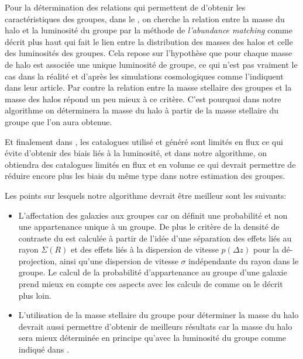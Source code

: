 Pour la détermination des relations qui permettent de d'obtenir les caractéristiques des groupes, dans le \citet{Yang+07}, on
cherche la relation entre la masse du halo et la luminosité du groupe par la méthode de \emph{l'abundance matching} comme décrit
plus haut qui fait le lien entre la distribution des masses des halos et celle des luminosités des groupes. Cela repose sur
l'hypothèse que pour chaque masse de halo est associée une unique luminosité de groupe, ce qui n'est pas vraiment le cas dans la
réalité et d'après les simulations cosmologiques comme l'indiquent \citet{Yang+07} dans leur article. Par contre la relation entre
la masse stellaire des groupes et la masse des halos répond un peu mieux à ce critère. C'est pourquoi dans notre algorithme on
déterminera la masse du halo à partir de la masse stellaire du groupe que l'on aura obtenue.

Et finalement dans \citet{Yang+07}, les catalogues utilisé et généré sont limités en flux ce qui évite d'obtenir des biais liés à
la luminosité, et dans notre algorithme, on obtiendra des catalogues limités en flux et en volume ce qui devrait permettre de
réduire encore plus les biais du même type dans notre estimation des groupes.

Les points sur lesquels notre algorithme devrait être meilleur sont les suivants:
\begin{itemize}
	\item L'affectation des galaxies aux groupes car on définit une probabilité et non une appartenance unique à un groupe. De
	plus le critère de la densité de contraste du \citet{Yang+07} est calculée à partir de l'idée d'une séparation des effets
	liés au rayon $\Sigma(R)$ et des effets liés à la dispersion de vitesse $p(\Delta{z})$ pour la dé-projection, ainsi qu'une
	dispersion de vitesse $\sigma$ indépendante du rayon dans le groupe. Le calcul de la probabilité d'appartenance au groupe
	d'une galaxie prend mieux en compte ces aspects avec les calculs de \citet{MBM10} comme on le décrit plus loin.
	\item L'utilisation de la masse stellaire du groupe pour déterminer la masse du halo devrait aussi permettre d'obtenir de
	meilleurs résultats car la masse du halo sera mieux déterminée en principe qu'avec la luminosité du groupe comme indiqué
	dans \citet{Yang+07}.
\end{itemize}

